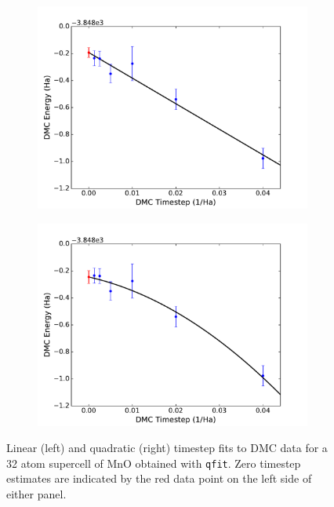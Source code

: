 \begin{figure}
  \centering
  \begin{subfigure}[t]{0.47\textwidth}
    \centering
    \includegraphics[trim=0mm 0mm 4mm 0mm,clip,width=\linewidth]{figures/qfit_timestep_linear.pdf}
  \end{subfigure}
  \begin{subfigure}[t]{0.47\textwidth}
    \centering
    \includegraphics[trim=2mm 0mm 4mm 0mm,clip,width=\linewidth]{figures/qfit_timestep_quadratic.pdf}
  \end{subfigure}
  \caption{Linear (left) and quadratic (right) timestep fits to DMC data for a 32 atom supercell of MnO obtained with \texttt{qfit}.  Zero timestep estimates are indicated by the red data point on the left side of either panel.\label{fig:qfit_timestep}}
\end{figure}

